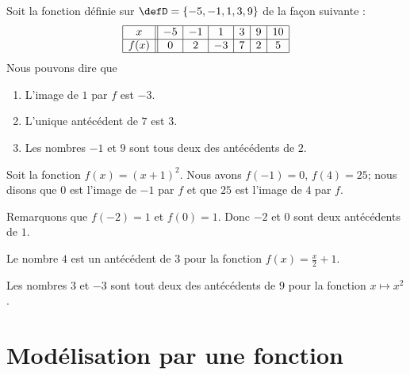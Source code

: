 
\begin{example}
    Soit la fonction définie sur \( \defD=\{ -5,-1,1,3,9 \}\) de la façon suivante :
    \begin{equation}
        \begin{array}[h]{|c||c|c|c|c|c|c|}
            \hline
            x&-5&-1&1&3&9&10\\
            \hline
            f(x)&0&2&-3&7&2&5\\
            \hline
        \end{array}
    \end{equation}
    Nous pouvons dire que
    \begin{enumerate}
        \item
            L'image de \( 1\) par \( f\) est \( -3\).
        \item
            L'unique antécédent de \( 7\) est \( 3\).
        \item
            Les nombres \( -1\) et \( 9\) sont tous deux des antécédents de \( 2\).
    \end{enumerate}
\end{example}

\begin{example}
    Soit la fonction \( f(x)=(x+1)^2\). Nous avons \( f(-1)=0\), \( f(4)=25\); nous disons que \( 0\) est l'image de \( -1\) par \( f\) et que \( 25\) est l'image de \( 4\) par \( f\).

    Remarquons que \( f(-2)=1\) et \( f(0)=1\). Donc \( -2\) et \( 0\) sont deux antécédents de \( 1\).
\end{example}

\begin{example}
    Le nombre \( 4\) est un antécédent de \( 3\) pour la fonction \( f(x)=\frac{ x }{ 2 }+1\).
\end{example}

\begin{example}
    Les nombres \( 3\) et \( -3\) sont tout deux des antécédents de \( 9\) pour la fonction \( x\mapsto x^2\).
\end{example}

\section{Modélisation par une fonction}

